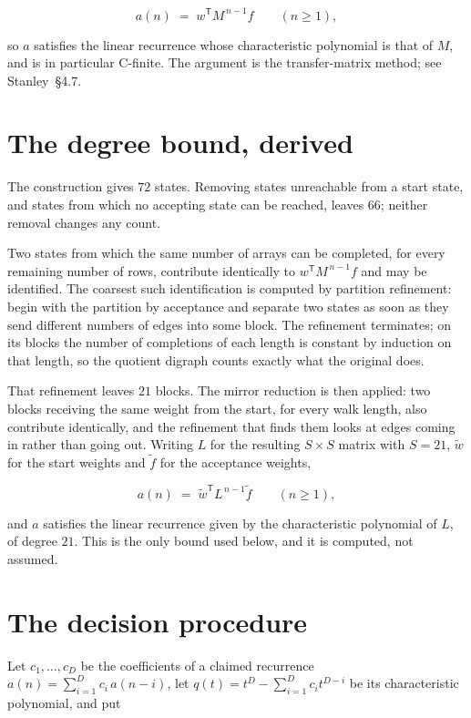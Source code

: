 \documentclass[11pt]{article}
\theoremstyle{definition}
\begin{document}
\[a(n) \;=\; w^{\mathsf T} M^{\,n-1} f \qquad (n \ge 1),\]

so $a$ satisfies the linear recurrence whose characteristic polynomial is that of $M$, and is in particular C-finite. The argument is the transfer-matrix method; see Stanley~\S4.7.

\section{The degree bound, derived}

The construction gives $72$ states. Removing states unreachable from a start state, and states from which no accepting state can be reached, leaves $66$; neither removal changes any count.

Two states from which the same number of arrays can be completed, for every remaining number of rows, contribute identically to $w^{\mathsf T}M^{\,n-1}f$ and may be identified. The coarsest such identification is computed by partition refinement: begin with the partition by acceptance and separate two states as soon as they send different numbers of edges into some block. The refinement terminates; on its blocks the number of completions of each length is constant by induction on that length, so the quotient digraph counts exactly what the original does.

That refinement leaves $21$ blocks. The mirror reduction is then applied: two blocks receiving the same weight from the start, for every walk length, also contribute identically, and the refinement that finds them looks at edges coming in rather than going out. Writing $L$ for the resulting $S \times S$ matrix with $S = 21$, $\tilde w$ for the start weights and $\tilde f$ for the acceptance weights,

\[a(n) \;=\; \tilde w^{\mathsf T} L^{\,n-1} \tilde f \qquad (n \ge 1),\]

and $a$ satisfies the linear recurrence given by the characteristic polynomial of $L$, of degree $21$. This is the only bound used below, and it is computed, not assumed.

\section{The decision procedure}

Let $c_1,\dots,c_D$ be the coefficients of a claimed recurrence $a(n) = \sum_{i=1}^{D} c_i\,a(n-i)$, let $q(t) = t^{D} - \sum_{i=1}^{D} c_i t^{D-i}$ be its characteristic polynomial, and put
\end{document}
